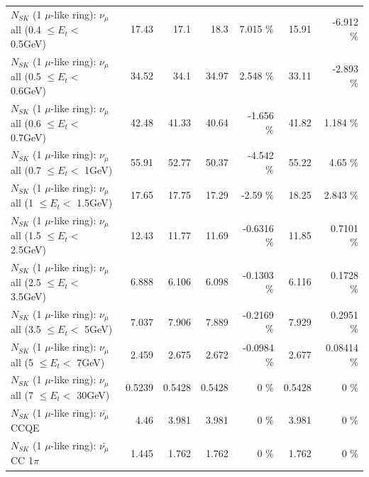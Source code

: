 \begin{table}
\begin{tabular}{| l | r | r | r  r | r  r |}
       $N_{SK}$ (1 $\mu$-like ring): $\nu_{\mu}$ all (0.4 $\leq E_{t} <$ 0.5GeV) &           17.43 &            17.1 &            18.3 &    7.015 \%  &           15.91 &   -6.912 \%  \\ 
       $N_{SK}$ (1 $\mu$-like ring): $\nu_{\mu}$ all (0.5 $\leq E_{t} <$ 0.6GeV) &           34.52 &            34.1 &           34.97 &    2.548 \%  &           33.11 &   -2.893 \%  \\ 
       $N_{SK}$ (1 $\mu$-like ring): $\nu_{\mu}$ all (0.6 $\leq E_{t} <$ 0.7GeV) &           42.48 &           41.33 &           40.64 &   -1.656 \%  &           41.82 &    1.184 \%  \\ 
         $N_{SK}$ (1 $\mu$-like ring): $\nu_{\mu}$ all (0.7 $\leq E_{t} <$ 1GeV) &           55.91 &           52.77 &           50.37 &   -4.542 \%  &           55.22 &     4.65 \%  \\ 
         $N_{SK}$ (1 $\mu$-like ring): $\nu_{\mu}$ all (1 $\leq E_{t} <$ 1.5GeV) &           17.65 &           17.75 &           17.29 &    -2.59 \%  &           18.25 &    2.843 \%  \\ 
       $N_{SK}$ (1 $\mu$-like ring): $\nu_{\mu}$ all (1.5 $\leq E_{t} <$ 2.5GeV) &           12.43 &           11.77 &           11.69 &  -0.6316 \%  &           11.85 &   0.7101 \%  \\ 
       $N_{SK}$ (1 $\mu$-like ring): $\nu_{\mu}$ all (2.5 $\leq E_{t} <$ 3.5GeV) &           6.888 &           6.106 &           6.098 &  -0.1303 \%  &           6.116 &   0.1728 \%  \\ 
         $N_{SK}$ (1 $\mu$-like ring): $\nu_{\mu}$ all (3.5 $\leq E_{t} <$ 5GeV) &           7.037 &           7.906 &           7.889 &  -0.2169 \%  &           7.929 &   0.2951 \%  \\ 
           $N_{SK}$ (1 $\mu$-like ring): $\nu_{\mu}$ all (5 $\leq E_{t} <$ 7GeV) &           2.459 &           2.675 &           2.672 &  -0.0984 \%  &           2.677 &  0.08414 \%  \\ 
          $N_{SK}$ (1 $\mu$-like ring): $\nu_{\mu}$ all (7 $\leq E_{t} <$ 30GeV) &          0.5239 &          0.5428 &          0.5428 &        0 \%  &          0.5428 &        0 \%  \\ 
\hline
\hline
\hline
                              $N_{SK}$ (1 $\mu$-like ring): $\bar{\nu_\mu}$ CCQE &            4.46 &           3.981 &           3.981 &        0 \%  &           3.981 &        0 \%  \\ 
                         $N_{SK}$ (1 $\mu$-like ring): $\bar{\nu_\mu}$ CC 1$\pi$ &           1.445 &           1.762 &           1.762 &        0 \%  &           1.762 &        0 \%  \\ 

\end{tabular}
\end{table}
